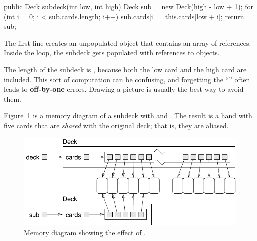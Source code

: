 \begin{code}
public Deck subdeck(int low, int high) {
    Deck sub = new Deck(high - low + 1);
    for (int i = 0; i < sub.cards.length; i++) {
        sub.cards[i] = this.cards[low + i];
    }
    return sub;
}
\end{code}

The first line creates an unpopulated  object that contains an array of  references.
Inside the  loop, the subdeck gets populated with references to  objects.


The length of the subdeck is , because both the low card and the high card are included.
This sort of computation can be confusing, and forgetting the ``'' often leads to {\bf off-by-one} errors.
Drawing a picture is usually the best way to avoid them.

%


Figure~\ref{fig.subdeck} is a memory diagram of a subdeck with  and .
The result is a hand with five cards that are {\em shared} with the original deck; that is, they are aliased.

\begin{figure}[!ht]
\begin{center}
\includegraphics{figs/subdeck.pdf}
\caption{Memory diagram showing the effect of .}
\label{fig.subdeck}
\end{center}
\end{figure}

